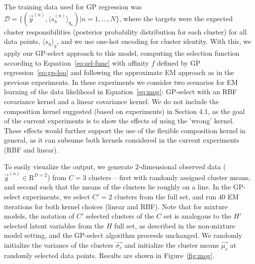 The training data used for GP regression was $\mathcal{D} = \{ (\vec{y}^{(n)}, \langle s_h^{(n)}\rangle_{q_n}) | n = 1, \dots, N \}$, where the targets were the expected cluster responsibilities (posterior probability distribution for each cluster) for all data points, $\langle s_h\rangle_{q}$, and we use one-hot encoding for cluster identity.
With this, we apply our GP-select approach to this model, computing the selection function according to Equation~\eqref{eq:sel-func} with affinity $f$ defined by GP regression~\eqref{eq:gp-loo} 
and following the approximate EM approach as in the previous experiments.
%
In these experiments we consider two scenarios for EM learning of the data likelihood in Equation~\eqref{eq:mog}: GP-select with an RBF covariance kernel and a linear covariance kernel.  
We do not include the composition kernel suggested (based on experiments) in Section 4.1, as the goal of the current experiments is to show the  effects of using the 'wrong' kernel. These effects would further support the use of the flexible composition kernel in general, as it can subsume both kernels considered in the current experiments (RBF and linear).
%

To easily visualize the output, we generate $2$-dimensional observed data ($\vec{y}^{(n)} \in \mathrm{R}^{D=2} $) from $C=3$ clusters -- first with randomly assigned cluster means, and second such that the means of the clusters lie roughly on a line.
In the GP-select experiments, we select $C' = 2$ clusters from the full set,
and run $40$ EM iterations for both kernel choices (linear and RBF).
Note that for mixture models, the notation of $C'$ selected clusters of the $C$ set is analogous to the $H'$ selected latent variables from the $H$ full set, as described in the non-mixture model setting, and the GP-select algorithm proceeds unchanged.
We randomly initialize the variance of the clusters $\vec{\sigma_c}$ and initialize the cluster means $\vec{\mu_c}$ at randomly selected data points.
Results are shown in Figure~\ref{fig:mog}.

